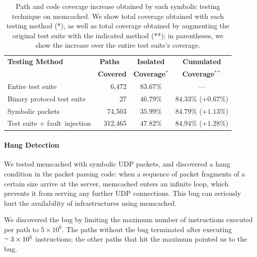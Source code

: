 \begin{table}
\small
\centering
\addtolength{\tabcolsep}{-1.3pt}
\begin{tabular}{| p{2.3cm} | r | c | c | }
\hline
{\bf Testing Method}   & {\bf Paths}~~       & {\bf Isolated}             & {\bf Cumulated}          \\ 
                                & {\bf  Covered}  & {\bf Coverage$^{*}$} & {\bf Coverage$^{**}$}      \\
\hline
Entire test suite               & 6,472         & $83.67\%$        &---                   \\
\hline
\raggedright Binary protocol test suite      & 27            & $46.79\%$        & $84.33\%$ ($+0.67\%$) \\
\hline
Symbolic packets                & 74,503        & $35.99\%$        & $84.79\%$ ($+1.13\%$) \\
\hline
\raggedright Test suite + fault~injection    & 312,465       & $47.82\%$        & $84.94\%$ ($+1.28\%$) \\
\hline
\end{tabular}
\caption{Path and code coverage increase obtained by each symbolic testing technique on memcached. We show total coverage obtained with each testing method (*), as well as total coverage obtained by augmenting the original test suite with the indicated method  (**); in parentheses, we show the increase over the entire test suite's coverage.}
\label{table:memcached}
\end{table}

\paragraph{Hang Detection}

We tested memcached with symbolic UDP packets, and \cnine discovered a hang condition in the packet parsing code: 
when a sequence of packet fragments of a certain size arrive at the server, memcached enters an infinite loop, which prevents it from serving any further UDP connections. This bug can seriously hurt the availability of infrastructures using memcached.

We discovered the bug by limiting the maximum number of instructions executed per path to $5 \times 10^6$.  The paths without the bug terminated after executing $\stackrel{\sim}{} 3\times 10^5$ instructions; the other paths that hit the maximum pointed us to the bug.

